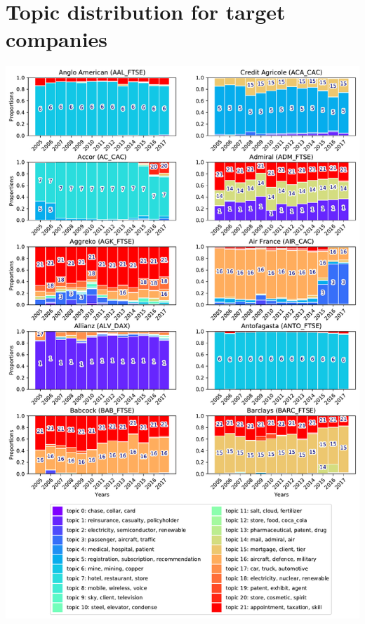 \documentclass[12pt,journal,letterpaper,oneside,onecolumn]{IEEEtran}
\begin{document}
\appendices

\section{Topic distribution for target companies}
\begin{center}
\includegraphics[width=0.85\linewidth]{images/companies_on_page_0.pdf}
\end{center}
\end{document}
